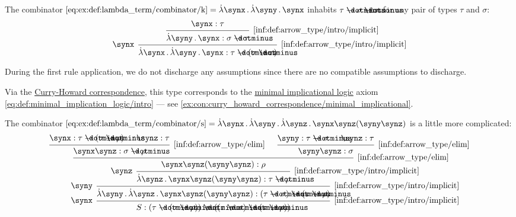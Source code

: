 \begin{example}
\begin{thmenum}
     The combinator \( \ref{eq:ex:def:lambda_term/combinator/k} = \qabs \synx \qabs \syny \synx \) inhabits \( \tau \synimplies \sigma \synimplies \tau \) for any pair of types \( \tau \) and \( \sigma \):
    \begin{equation*}
      \begin{prooftree}
        \hypo{ \synx: \tau }
        \infer1[\ref{inf:def:arrow_type/intro/implicit}]{ \qabs \syny \synx: \sigma \synimplies \tau }
        \infer[left label=\( \synx \)]1[\ref{inf:def:arrow_type/intro/implicit}]{ \qabs \synx \qabs \syny \synx: \tau \synimplies (\sigma \synimplies \tau) }
      \end{prooftree}
    \end{equation*}

    During the first rule application, we do not discharge any assumptions since there are no compatible assumptions to discharge.

    Via the \hyperref[con:curry_howard_correspondence]{Curry-Howard correspondence}, this type corresponds to the \hyperref[def:minimal_implication_logic]{minimal implicational logic} axiom \eqref{eq:def:minimal_implication_logic/intro} --- see \cref{ex:con:curry_howard_correspondence/minimal_implicational}.

     The combinator \( \ref{eq:ex:def:lambda_term/combinator/s} = \qabs \synx \qabs \syny \qabs \synz \synx \synz (\syny \synz) \) is a little more complicated:
    \begin{equation*}
      \begin{prooftree}
        \hypo{ \synx: \tau \synimplies (\sigma \synimplies \rho) }
        \hypo{ \synz: \tau }
        \infer2[\ref{inf:def:arrow_type/elim}]{ \synx \synz: \sigma \synimplies \rho }

        \hypo{ \syny: \tau \synimplies \sigma }
        \hypo{ \synz: \tau }
        \infer2[\ref{inf:def:arrow_type/elim}]{ \syny \synz: \sigma }

        \infer2[\ref{inf:def:arrow_type/elim}]{ \synx \synz (\syny \synz): \rho }
        \infer[left label=\( \synz \)]1[\ref{inf:def:arrow_type/intro/implicit}]{ \qabs \synz \synx \synz (\syny \synz): \tau \synimplies \rho }
        \infer[left label=\( \syny \)]1[\ref{inf:def:arrow_type/intro/implicit}]{ \qabs \syny \qabs \synz \synx \synz (\syny \synz): (\tau \synimplies \sigma) \synimplies (\tau \synimplies \rho) }
        \infer[left label=\( \synx \)]1[\ref{inf:def:arrow_type/intro/implicit}]{ S: (\tau \synimplies (\sigma \synimplies \rho)) \synimplies ((\tau \synimplies \sigma) \synimplies (\tau \synimplies \rho)) }
      \end{prooftree}
    \end{equation*}


\end{thmenum}
\end{example}
